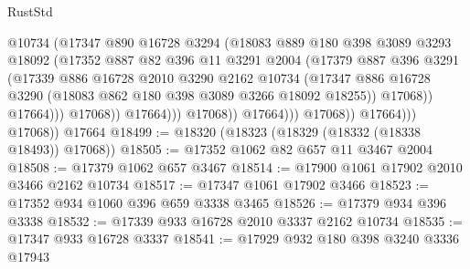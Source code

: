 \begin{lexlean}{RustStd}
\begin{coremodule}
                                      @10734
                                      (@17347
                                        @890
                                        @16728
                                        @3294
                                        (@18083
                                          @889
                                          @180
                                          @398
                                          @3089
                                          @3293
                                          @18092
                                          (@17352
                                            @887
                                            @82
                                            @396
                                            @11
                                            @3291
                                            @2004
                                            (@17379
                                              @887
                                              @396
                                              @3291
                                              (@17339
                                                @886
                                                @16728
                                                @2010
                                                @3290
                                                @2162
                                                @10734
                                                (@17347
                                                  @886
                                                  @16728
                                                  @3290
                                                  (@18083 @862 @180 @398 @3089 @3266 @18092 @18255))
                                                @17068))
                                            @17664)))
                                      @17068))
                                  @17664)))
                            @17068))
                        @17664)))
                  @17068))
              @17664)))
        @17068))
    @17664
@18499 := @18320 (@18323 (@18329 (@18332 (@18338 @18493)) @17068))
@18505 := @17352 @1062 @82 @657 @11 @3467 @2004
@18508 := @17379 @1062 @657 @3467
@18514 := @17900 @1061 @17902 @2010 @3466 @2162 @10734
@18517 := @17347 @1061 @17902 @3466
@18523 := @17352 @934 @1060 @396 @659 @3338 @3465
@18526 := @17379 @934 @396 @3338
@18532 := @17339 @933 @16728 @2010 @3337 @2162 @10734
@18535 := @17347 @933 @16728 @3337
@18541 := @17929 @932 @180 @398 @3240 @3336 @17943

\end{coremodule}
\end{lexlean}
